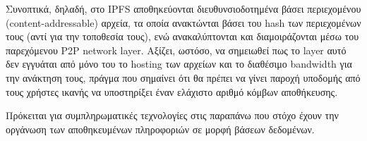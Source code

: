 Συνοπτικά, δηλαδή, στο IPFS αποθηκεύονται διευθυνσιοδοτημένα βάσει περιεχομένου (content-addressable) αρχεία, τα οποία ανακτώνται βάσει του hash των περιεχομένων τους (αντί για την τοποθεσία τους), ενώ ανακαλύπτονται και διαμοιράζονται μέσω του παρεχόμενου P2P network layer. Αξίζει, ωστόσο, να σημειωθεί πως το layer αυτό δεν εγγυάται από μόνο του το hosting των αρχείων και το διαθέσιμο bandwidth για την ανάκτηση τους, πράγμα που σημαίνει ότι θα πρέπει να γίνει παροχή υποδομής από τους χρήστες ικανής να υποστηρίξει έναν ελάχιστο αριθμό κόμβων αποθήκευσης.

Πρόκειται για συμπληρωματικές τεχνολογίες στις παραπάνω που στόχο έχουν την οργάνωση των αποθηκευμένων πληροφοριών σε μορφή βάσεων δεδομένων.
